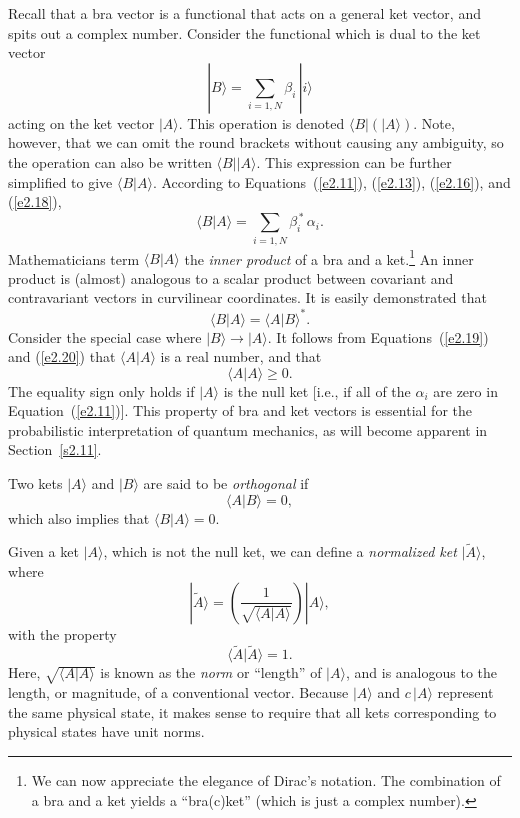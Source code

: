 Recall that a bra vector is a functional that acts on a general ket vector,
and spits out a complex number. Consider the functional which is dual to the
ket vector 
\begin{equation}\label{e2.18}
|B\rangle = \sum_{i=1,N} \beta_i\, |i\rangle
\end{equation}
acting on the ket vector $|A\rangle$. This
operation is denoted $\langle B|(|A \rangle )$. Note, however, that 
we can omit the round brackets without causing any ambiguity, so the
operation can also be written $\langle B||A \rangle$. This 
expression can be further simplified
 to give $\langle B|A \rangle$. According to Equations~(\ref{e2.11}), (\ref{e2.13}), (\ref{e2.16}), 
and (\ref{e2.18}),
\begin{equation}\label{e2.19}
\langle B|A \rangle = \sum_{i=1,N} \beta_i^{\,\ast} \,\alpha_i.
\end{equation}
Mathematicians term $\langle B|A \rangle$ 
 the {\em inner product}\/ of a bra and a ket.\footnote{We 
can now appreciate the elegance of Dirac's 
notation. The combination of a bra and a ket yields a ``bra(c)ket'' (which is
just a complex number).}
 An inner product is (almost) analogous to a
scalar product between  covariant and contravariant vectors in 
 curvilinear coordinates.
It is easily demonstrated that
\begin{equation}\label{e2.20}
\langle B|A \rangle = \langle A|B \rangle^\ast.
\end{equation}
Consider the special case where $|B\rangle \rightarrow |A \rangle$. It
follows from Equations~(\ref{e2.19}) and (\ref{e2.20}) 
that $\langle A|A\rangle$ is a real number, and that
\begin{equation}\label{e2.21}
\langle A|A \rangle \geq 0.
\end{equation}
The equality sign only holds if $|A\rangle$ is the null ket [{\rm i.e.}, if
all of the $\alpha_i$ are zero in Equation~(\ref{e2.11})]. This property of bra and ket
vectors is essential for the probabilistic interpretation of quantum mechanics,
as will become apparent in Section~\ref{s2.11}. 

Two kets $|A\rangle$ and $|B \rangle$ are said to be {\em orthogonal}\/
if 
\begin{equation}
\langle A|B \rangle = 0,
\end{equation}
which also implies that $\langle B|A \rangle=0$.

Given a ket $|A\rangle$, which is not the null ket,
 we can define a {\em normalized ket}\/ $|\tilde{A}\rangle$, where
\begin{equation}
|\tilde{A}\rangle = \left(\frac{1}{\sqrt{\langle A|A \rangle }}\right)|A\rangle,
\end{equation}
with the property
\begin{equation}
\langle \tilde{A}|\tilde{A} \rangle = 1.
\end{equation}
Here, $\sqrt{\langle A|A \rangle }$ is known as the {\em norm}\/ 
or ``length'' of $|A\rangle$, and
is analogous to the length, or magnitude,  of a conventional vector. Because 
$|A\rangle$ and $c\, |A\rangle$ represent the same physical state, it makes sense
to require that all kets corresponding to  physical states have unit norms. 

